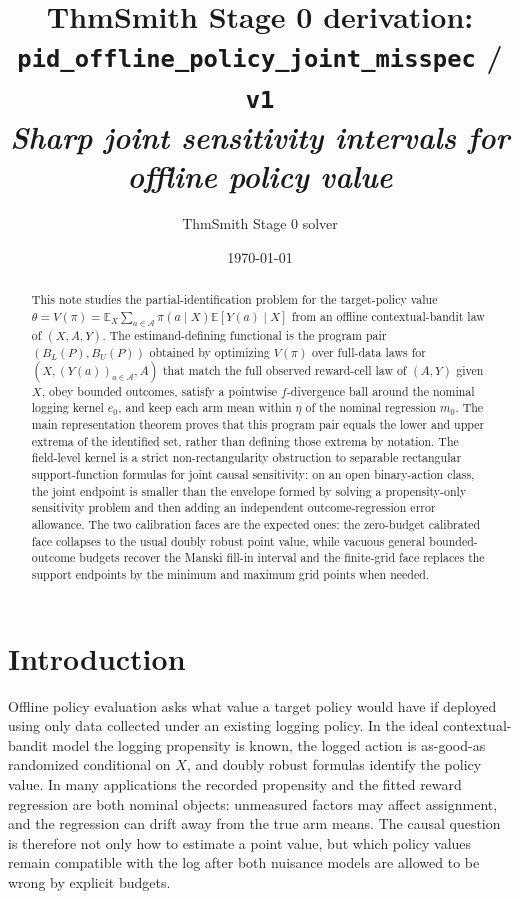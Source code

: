 \documentclass[11pt]{article}
\title{ThmSmith Stage 0 derivation: \texttt{pid\_offline\_policy\_joint\_misspec} / \texttt{v1}%
  \\ \large\textit{Sharp joint sensitivity intervals for offline policy value}}
\author{ThmSmith Stage 0 solver}
\date{\today}
\newcommand{\E}{\mathbb{E}}
\theoremstyle{definition}
\theoremstyle{plain}
\theoremstyle{remark}
\begin{document}
\maketitle



\begin{abstract}
This note studies the partial-identification problem for the target-policy value
$\theta=V(\pi)=\E_X\sum_{a\in\mathcal A}\pi(a\mid X)\E[Y(a)\mid X]$
from an offline contextual-bandit law of $(X,A,Y)$.  The estimand-defining
functional is the program pair $(B_L(P),B_U(P))$ obtained by optimizing
$V(\pi)$ over full-data laws for $(X,(Y(a))_{a\in\mathcal A},A)$ that match the
full observed reward-cell law of $(A,Y)$ given $X$, obey bounded outcomes,
satisfy a pointwise $f$-divergence ball around the nominal logging kernel
$e_0$, and keep each arm mean within $\eta$ of the nominal regression $m_0$.
The main representation theorem proves that this
program pair equals the lower and upper extrema of the identified set, rather
than defining those extrema by notation.  The field-level kernel is a strict
non-rectangularity obstruction to separable rectangular support-function
formulas for joint causal sensitivity: on an open binary-action class, the
joint endpoint is smaller than the envelope formed by solving a propensity-only
sensitivity problem and then adding an independent outcome-regression error
allowance.  The two calibration faces are the expected ones: the zero-budget
calibrated face collapses to the usual doubly robust point value, while vacuous
general bounded-outcome budgets recover the Manski fill-in interval and the
finite-grid face replaces the support endpoints by the minimum and maximum grid
points when needed.
\end{abstract}

\section{Introduction}
Offline policy evaluation asks what value a target policy would have if deployed
using only data collected under an existing logging policy.  In the ideal
contextual-bandit model the logging propensity is known, the logged action is
as-good-as randomized conditional on $X$, and doubly robust formulas identify
the policy value.  In many applications the recorded propensity and the fitted
reward regression are both nominal objects: unmeasured factors may affect
assignment, and the regression can drift away from the true arm means.  The
causal question is therefore not only how to estimate a point value, but which
policy values remain compatible with the log after both nuisance models are
allowed to be wrong by explicit budgets.
\end{document}
